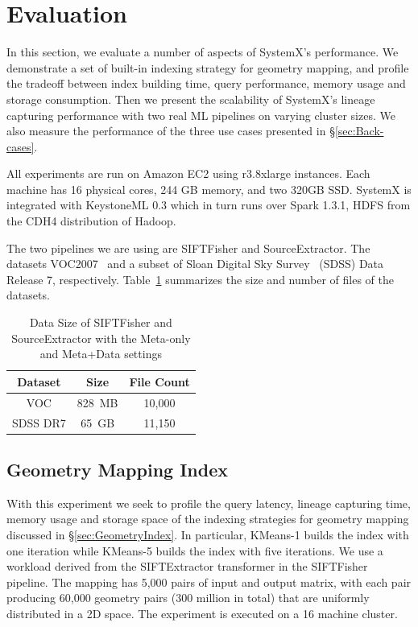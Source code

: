 \documentclass{sig-alternate}
\begin{document}
\section{Evaluation}
\label{sec:Perf}
In this section, we evaluate a number of aspects of SystemX's performance.
We demonstrate a set of built-in indexing strategy for geometry mapping, and profile the tradeoff
between index building time, query performance, memory usage and storage consumption.
Then we present the scalability of SystemX's lineage capturing performance with two real ML pipelines on varying cluster sizes.
We also measure the performance of the three use cases presented in \S\ref{sec:Back-cases}.

All experiments are run on Amazon EC2 using r3.8xlarge instances.
Each machine has 16 physical cores, 244 GB memory, and two 320GB SSD. 
SystemX is integrated with KeystoneML 0.3 which in turn runs over Spark 1.3.1, HDFS from the
CDH4 distribution of Hadoop. 

The two pipelines we are using are SIFTFisher and SourceExtractor. 
The datasets VOC2007~\cite{pascal-voc-2007} and a subset of Sloan Digital Sky Survey~\cite{york00} (SDSS) Data Release 7, respectively.
Table~\ref{tb:datasets} summarizes the size and number of files of the datasets.

\begin{table}[t]
\begin{center}
    \caption{Data Size of SIFTFisher and SourceExtractor with the Meta-only and Meta+Data settings}
    \begin{scriptsize}
    \begin{tabular}{ | c | c | c | }
    \hline
    Dataset & Size & File Count \\ \hline \hline
    VOC& 828~MB &10,000  \\ \hline
    SDSS DR7 & 65~GB & 11,150 \\ \hline
    \end{tabular}
    \end{scriptsize}
    \label{tb:datasets}
\end{center}   
\end{table}

\subsection{Geometry Mapping Index}
\label{sec:Perf-Index}
With this experiment we seek to profile the query latency, lineage capturing time, memory usage and storage space 
of the indexing strategies for geometry mapping discussed in \S\ref{sec:GeometryIndex}.
In particular, KMeans-1 builds the index with one iteration while KMeans-5 builds the index with five iterations.
We use a workload derived from the SIFTExtractor transformer in the SIFTFisher pipeline. 
The mapping has 5,000 pairs of input and output matrix, with each pair producing 60,000 geometry pairs (300 million in total) that are uniformly distributed
in a 2D space. 
The experiment is executed on a 16 machine cluster.
\end{document}

